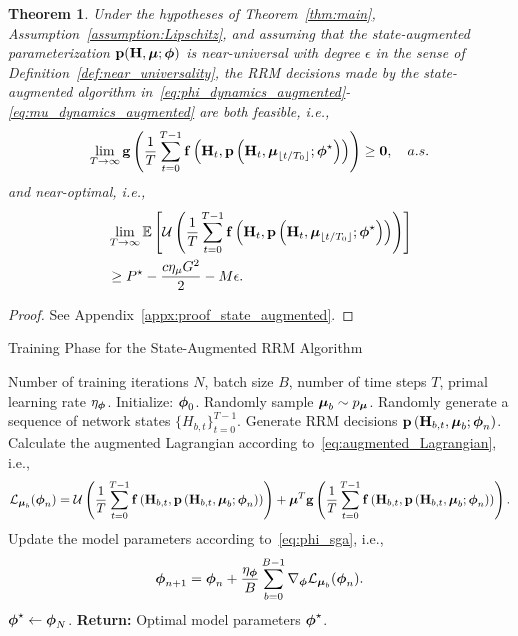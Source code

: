\documentclass[lettersize,journal]{IEEEtran}
\newtheorem{theorem}{\hspace{0pt}\bf Theorem}
\def\E{\mathbb{E}}
\begin{document}
\begin{theorem}\label{thm:near_universality_result}
Under the hypotheses of Theorem~\ref{thm:main}, Assumption~\ref{assumption:Lipschitz}, and assuming that the state-augmented parameterization ${\mathbf p}({\mathbf H}, \boldsymbol{\mu}; \boldsymbol{\phi})$ is near-universal with degree $\epsilon$ in the sense of Definition~\ref{def:near_universality}, the RRM decisions made by the state-augmented algorithm in~\eqref{eq:phi_dynamics_augmented}-\eqref{eq:mu_dynamics_augmented} are both feasible, i.e.,
\begin{align}\label{eq:thm_feasibility_state_augmented}
\lim_{T\to\infty}{\mathbf g}\left( \frac{1}{T} \sum_{t=0}^{T-1} {\mathbf f}\left({\mathbf H}_t, {\mathbf p}\left({\mathbf H}_t, \boldsymbol{\mu}_{\lfloor t/T_0 \rfloor}; \boldsymbol{\phi}^{\star}\right) \right) \right) \geq {\ensuremath{\mathbf 0}}, \quad a.s.
\end{align}
and near-optimal, i.e.,
\begin{align}
&\lim_{T\to\infty} \E\left[ \mathcal{U}\left( \frac{1}{T} \sum_{t=0}^{T-1} \bbf\left(\bbH_t, \bbp\left(\bbH_t, \bbmu_{\lfloor t/T_0 \rfloor}; \bbphi^{\star}\right) \right) \right)\right] \nonumber \\
&\geq P^{\star} - \frac{c\eta_{\mu}G^2}{2} - M \epsilon.\label{eq:thm_optimality_state_augmented}
\end{align}
\end{theorem}

\begin{proof}
See Appendix~\ref{appx:proof_state_augmented}.
\end{proof}


\begin{algorithm*}[t]
\caption{Training Phase for the State-Augmented RRM Algorithm}
    \label{alg:training}
    \begin{algorithmic}[1]
     Number of training iterations $N$, batch size $B$, number of time steps $T$, primal learning rate $\eta_{\boldsymbol{\phi}}$.
    \STATE Initialize: $\boldsymbol{\phi}_0$.
            \STATE
            Randomly sample $\boldsymbol{\mu}_b \sim p_{\boldsymbol{\mu}}$.
            \STATE
            Randomly generate a sequence of network states $\{H_{b,t}\}_{t=0}^{T-1}$.
                \STATE 
                Generate RRM decisions ${\mathbf p}\left({\mathbf H}_{b,t}, \boldsymbol{\mu}_b; \boldsymbol{\phi}_n\right)$.
            \ENDFOR
            \STATE
            Calculate the augmented Lagrangian according to~\eqref{eq:augmented_Lagrangian}, i.e., $${\mathcal L}_{\boldsymbol{\mu}_b}(\boldsymbol{\phi}_n) = \mathcal{U}\left( \frac{1}{T} \sum_{t=0}^{T-1} {\mathbf f}\left({\mathbf H}_{b,t}, {\mathbf p}\left({\mathbf H}_{b,t}, \boldsymbol{\mu}_b; \boldsymbol{\phi}_n\right)\right) \right)  + \boldsymbol{\mu}^T {\mathbf g}\left( \frac{1}{T} \sum_{t=0}^{T-1}{\mathbf f}\left({\mathbf H}_{b,t}, {\mathbf p}\left({\mathbf H}_{b,t}, \boldsymbol{\mu}_b; \boldsymbol{\phi}_n\right)\right) \right).$$
        \ENDFOR
        \STATE
        Update the model parameters according to~\eqref{eq:phi_sga}, i.e., $$\boldsymbol{\phi}_{n+1} = \boldsymbol{\phi}_n +  \frac{\eta_{\boldsymbol{\phi}}}{B} \sum_{b=0}^{B-1} \nabla_{\boldsymbol{\phi}} {\mathcal L}_{\boldsymbol{\mu}_b}(\boldsymbol{\phi}_n).$$
    \ENDFOR
    \STATE
    $\boldsymbol{\phi}^{\star} \gets \boldsymbol{\phi}_N$.
    \STATE
    {\bfseries Return:} {Optimal model parameters $\boldsymbol{\phi}^{\star}$.}
    \end{algorithmic}
\end{algorithm*}
\end{document}
